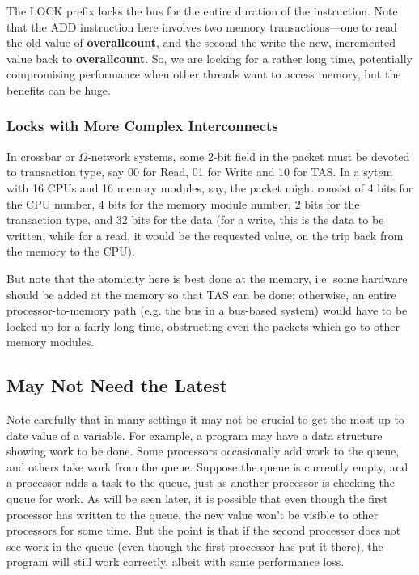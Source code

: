 The LOCK prefix locks the bus for the entire duration of the
instruction.  Note that the ADD instruction here involves two memory
transactions---one to read the old value of {\bf overallcount}, and the
second the write the new, incremented value back to {\bf overallcount}.
So, we are locking for a rather long time, potentially compromising
performance when other threads want to access memory, but the benefits
can be huge.

\subsubsection{Locks with More Complex Interconnects}

In crossbar or $\Omega$-network systems, some 2-bit field in the packet
must be devoted to transaction type, say 00 for Read, 01 for Write and
10 for TAS.  In a sytem with 16 CPUs and 16 memory modules, say, the
packet might consist of 4 bits for the CPU number, 4 bits for the memory
module number, 2 bits for the transaction type, and 32 bits for the data
(for a write, this is the data to be written, while for a read, it would
be the requested value, on the trip back from the memory to the CPU).

But note that the atomicity here is best done at the memory, i.e. some
hardware should be added at the memory so that TAS can be done;
otherwise, an entire processor-to-memory path (e.g. the bus in a
bus-based system) would have to be locked up for a fairly long time,
obstructing even the packets which go to other memory modules.

\subsection{May Not Need the Latest}

Note carefully that in many settings it may not be crucial to get the
most up-to-date value of a variable.  For example, a program may have a
data structure showing work to be done.  Some processors occasionally
add work to the queue, and others take work from the queue.  Suppose the
queue is currently empty, and a processor adds a task to the queue, just
as another processor is checking the queue for work.  As will be seen
later, it is possible that even though the first processor has written
to the queue, the new value won't be visible to other processors for
some time.  But the point is that if the second processor does not see
work in the queue (even though the first processor has put it there),
the program will still work correctly, albeit with some performance
loss. 

